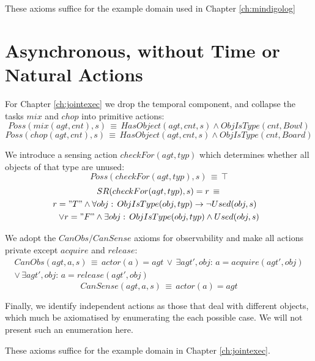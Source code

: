 These axioms suffice for the example domain used in Chapter \ref{ch:mindigolog}


\section*{Asynchronous, without Time or Natural Actions}

For Chapter \ref{ch:jointexec} we drop the temporal component, and
collapse the tasks $mix$ and $chop$ into primitive actions:\[
Poss(mix(agt,cnt),s)\,\equiv\, HasObject(agt,cnt,s)\wedge ObjIsType(cnt,Bowl)\]
 \[
Poss(chop(agt,cnt),s)\,\equiv\, HasObject(agt,cnt,s)\wedge ObjIsType(cnt,Board)\]


We introduce a sensing action $checkFor(agt,typ)$ which determines
whether all objects of that type are unused:\[
Poss(checkFor(agt,typ),s)\,\equiv\,\top\]
 \begin{multline*}
SR(checkFor(agt,typ),s)=r\,\equiv\,\\
\shoveright{r="T"\wedge\forall obj:\, ObjIsType(obj,typ)\rightarrow\neg Used(obj,s)}\\
\vee r="F"\wedge\exists obj:\, ObjIsType(obj,typ)\wedge Used(obj,s)\end{multline*}


We adopt the $CanObs/CanSense$ axioms for observability and make
all actions private except $acquire$ and $release$:\begin{multline*}
CanObs(agt,a,s)\,\equiv\, actor(a)=agt\,\vee\,\exists agt',obj:\, a=acquire(agt',obj)\\
\vee\,\exists agt',obj:\, a=release(agt',obj)\end{multline*}
 \[
CanSense(agt,a,s)\,\equiv\, actor(a)=agt\]


Finally, we identify independent actions as those that deal with different
objects, which much be axiomatised by enumerating the each possible
case. We will not present such an enumeration here.

These axioms suffice for the example domain in Chapter \ref{ch:jointexec}.


